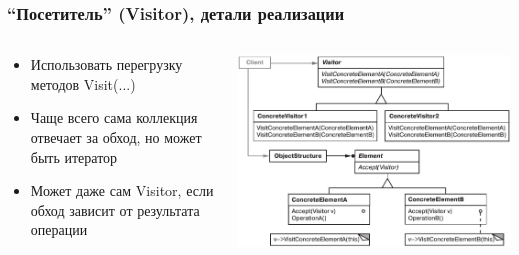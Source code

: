 \documentclass[xetex,mathserif,serif]{beamer}
\begin{document}
	\begin{frame}
		\frametitle{``Посетитель'' (Visitor), детали реализации}
		\begin{columns}
			\begin{column}{0.4\textwidth}
				\begin{itemize}
					\item Использовать перегрузку методов Visit(...)
					\item Чаще всего сама коллекция отвечает за обход, но может быть итератор
					\item Может даже сам Visitor, если обход зависит от результата операции
				\end{itemize}
			\end{column}
			\begin{column}{0.6\textwidth}
				\begin{center}
					\includegraphics[width=\textwidth]{visitor.png}
				\end{center}
			\end{column}
		\end{columns}
	\end{frame}

\end{document}
